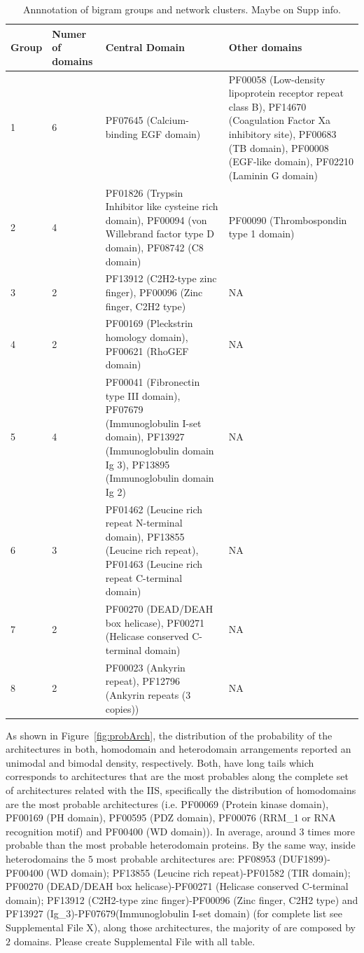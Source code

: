 \documentclass[11pt]{article}
\newcommand{\TODO}[1]{\begingroup\color{red}#1\endgroup}
\begin{document}
\begin{table}
\centering
\begin{tabular}{p{1cm}p{1.5cm}p{7cm}p{5cm}}
  \toprule 
  \textbf{Group} & \textbf{Numer of domains} & \textbf{Central Domain} & \textbf{Other domains} \\
  \midrule 
  1 & 6 & PF07645 (Calcium-binding EGF domain)& PF00058 (Low-density lipoprotein receptor repeat class B),
  PF14670 (Coagulation Factor Xa inhibitory site), PF00683 (TB domain), PF00008 (EGF-like domain), 
  PF02210 (Laminin G domain) \\
  2 & 4 & PF01826 (Trypsin Inhibitor like cysteine rich domain), PF00094 (von Willebrand factor type D domain), 
  PF08742 (C8 domain) & PF00090 (Thrombospondin type 1 domain)\\
  3 & 2 & PF13912 (C2H2-type zinc finger), PF00096 (Zinc finger, C2H2 type) & NA \\
  4 & 2 & PF00169 (Pleckstrin homology domain), PF00621 (RhoGEF domain) & NA \\
  5 & 4 & PF00041 (Fibronectin type III domain), PF07679 (Immunoglobulin I-set domain), 
  PF13927 (Immunoglobulin domain Ig 3), PF13895 (Immunoglobulin domain Ig 2) & NA \\
  6 & 3 & PF01462 (Leucine rich repeat N-terminal domain), PF13855 (Leucine rich repeat),
  PF01463 (Leucine rich repeat C-terminal domain) & NA \\
  7 & 2 & PF00270 (DEAD/DEAH box helicase), PF00271 (Helicase conserved C-terminal domain) & NA \\
  8 & 2 & PF00023 (Ankyrin repeat), PF12796 (Ankyrin repeats (3 copies)) & NA \\
  \bottomrule 
\end{tabular}
\caption{Annnotation of bigram groups and network clusters. \TODO{Maybe on Supp info.}}\label{tab:meansDomains}
\end{table}

As shown in Figure~\ref{fig:probArch}, the distribution of the probability of the 
architectures in both, homodomain and heterodomain arrangements reported an unimodal 
and bimodal density, respectively. Both, have long tails which corresponds to architectures that
are the most probables along the complete set of architectures related with the IIS, 
specifically the distribution of homodomains are the most probable architectures 
(i.e. PF00069 (Protein kinase domain), PF00169 (PH domain), PF00595 (PDZ domain), 
PF00076 (RRM\_1 or RNA recognition motif) and PF00400 (WD domain)). In average, around $3$ times
more probable than the most probable heterodomain proteins. By the same way, inside 
heterodomains the $5$ most probable architectures are: PF08953 (DUF1899)-PF00400 (WD domain); 
PF13855 (Leucine rich repeat)-PF01582 (TIR domain); PF00270 (DEAD/DEAH box helicase)-PF00271 
(Helicase conserved C-terminal domain); PF13912 (C2H2-type zinc finger)-PF00096
(Zinc finger, C2H2 type) and PF13927 (Ig\_3)-PF07679(Immunoglobulin I-set domain)
(for complete list see Supplemental File X), along those architectures, the majority of 
are composed by $2$ domains. \TODO{Please create Supplemental File with all table}.
\end{document}
